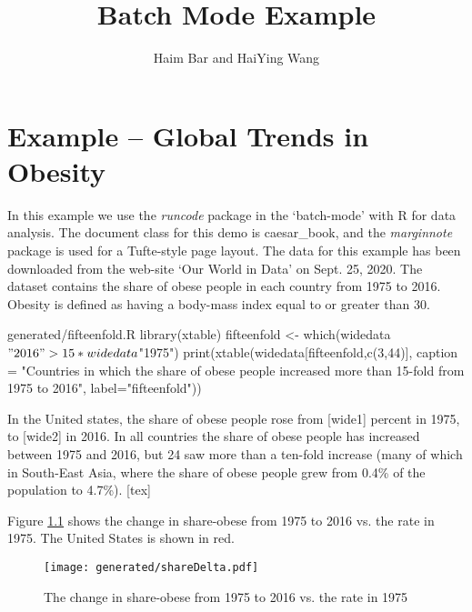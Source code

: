 \documentclass{caesar_book}
\title{Batch Mode Example}
\author{Haim Bar and HaiYing Wang}
\begin{document}
\mainmatter
\chapter{Example -- Global Trends in Obesity}
In this example  we use the \textit{runcode} package in the `batch-mode' with R for data analysis. The document class for this demo is caesar\_book, and the \textit{marginnote} package is used for a Tufte-style page layout.
The data for this example has been downloaded from the web-site `Our World in Data'
 on Sept. 25, 2020. The dataset contains the share of obese people in each country from 1975 to 2016. Obesity is defined as having a body-mass index equal to or greater than 30.

\begin{filecontents*}{generated/fifteenfold.R}
library(xtable)
fifteenfold <- which(widedata$"2016" > 15*widedata$"1975")
print(xtable(widedata[fifteenfold,c(3,44)], caption = "Countries in which the share of obese people increased more than 15-fold from 1975 to 2016", label="fifteenfold"))
\end{filecontents*}

In the United states, the share of obese people rose from  [wide1] percent in 1975, to [wide2] in 2016. 
In all countries the share of obese people has increased between 1975 and 2016, but 24 saw more than a ten-fold increase (many of which in South-East Asia, where the share of obese people grew from 0.4\% of the population to 4.7\%).
[tex]

Figure \ref{sharegain} shows the change in share-obese from 1975 to 2016 vs. the rate in 1975. The United States is shown in red.

\begin{figure}[t]
\begin{center}
\texttt{[image: generated/shareDelta.pdf]}
\caption{The change in share-obese from 1975 to 2016 vs. the rate in 1975}
\label{sharegain}
\end{center}
\end{figure}
\end{document}
